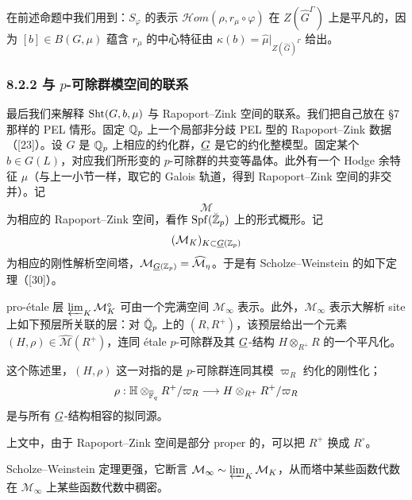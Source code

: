 \begin{remark}\label{rem:8.3}
在前述命题中我们用到：$S_{\varphi}$ 的表示 $\mathscr{H}om(\rho,r_\mu\circ\varphi)$ 在 $Z(\widehat{G}^{\Gamma})$ 上是平凡的，因为 $[b]\in B(G,\mu)$ 蕴含 $r_\mu$ 的中心特征由 $\kappa(b)=\widehat{\mu}|_{Z(\widehat{G})^{\Gamma}}$ 给出。
\end{remark}


\subsubsection*{8.2.2 与 $p$-可除群模空间的联系}

最后我们来解释 $\operatorname{Sht}(G,b,\mu)$ 与 Rapoport--Zink 空间的联系。我们把自己放在 §7 那样的 PEL 情形。固定 $\mathbb{Q}_p$ 上一个局部非分歧 PEL 型的 Rapoport--Zink 数据（[23]）。设 $G$ 是 $\mathbb{Q}_p$ 上相应的约化群，$\underline{G}$ 是它的约化整模型。固定某个 $b\in G(L)$，对应我们所形变的 $p$-可除群的共变等晶体。此外有一个 Hodge 余特征 $\mu$（与上一小节一样，取它的 Galois 轨道，得到 Rapoport--Zink 空间的非交并）。记
\[
\widehat{\mathcal{M}}
\]
为相应的 Rapoport--Zink 空间，看作 $\operatorname{Spf}(\breve{\mathbb{Z}}_p)$ 上的形式概形。记
\[
(\mathcal{M}_K)_{K\subset\underline{G}(\mathbb{Z}_p)}
\]
为相应的刚性解析空间塔，$\mathcal{M}_{\underline{G}(\mathbb{Z}_p)}=\widehat{\mathcal{M}}_\eta$。于是有 Scholze--Weinstein 的如下定理（[30]）。

\begin{theorem}\label{thm:8.4}
pro-étale 层 $\varprojlim_K\mathcal{M}_K^{\diamond}$ 可由一个完满空间 $\mathcal{M}_\infty$ 表示。此外，$\mathcal{M}_\infty$ 表示大解析 site 上如下预层所关联的层：对 $\breve{\mathbb{Q}}_p$ 上的 $(R,R^+)$，该预层给出一个元素 $(H,\rho)\in\widehat{\mathcal{M}}(R^+)$，连同 étale $p$-可除群及其 $\underline{G}$-结构 $H\otimes_{R^+}R$ 的一个平凡化。
\end{theorem}

这个陈述里，$(H,\rho)$ 这一对指的是 $p$-可除群连同其模 $\varpi_R$ 约化的刚性化；
\[
\rho:\mathbb{H}\otimes_{\overline{\mathbb{F}}_q}R^+/\varpi_R\longrightarrow H\otimes_{R^+}R^+/\varpi_R
\]
是与所有 $\underline{G}$-结构相容的拟同源。

\begin{remark}\label{rem:8.5}
上文中，由于 Rapoport--Zink 空间是部分 proper 的，可以把 $R^+$ 换成 $R^{\circ}$。
\end{remark}

\begin{remark}\label{rem:8.6}
Scholze--Weinstein 定理更强，它断言 $\mathcal{M}_\infty\sim\varprojlim_K\mathcal{M}_K$，从而塔中某些函数代数在 $\mathcal{M}_\infty$ 上某些函数代数中稠密。
\end{remark}

